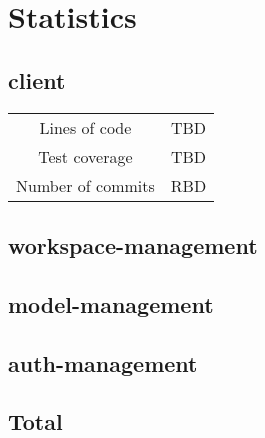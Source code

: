 \section{Statistics}
\subsection{client}
\begin{tabular}{ c|c } 
    Lines of code & TBD \\ 
    Test coverage & TBD \\ 
    Number of commits & RBD \\ 
\end{tabular}

\subsection{workspace-management}
\subsection{model-management}
\subsection{auth-management}
\subsection{Total}